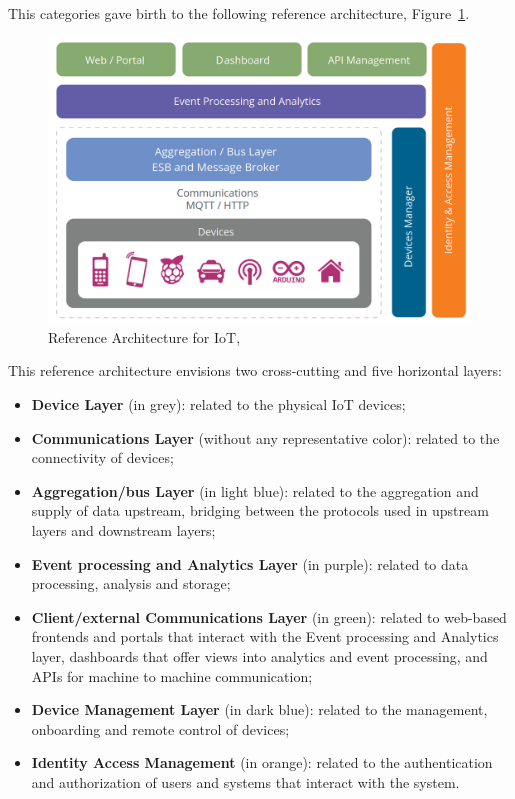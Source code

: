 This categories gave birth to the following reference architecture, Figure~\ref{fig:stateofart:arch:wso2:ra}.

\begin{figure}[H]
    \centering
    \includegraphics[scale=0.4]{
        assets/figures/wso2-ira.png
    }
    \caption[WSO2 Reference Architecture for IoT]{Reference Architecture for IoT, \cite{wso2ira}}
    \label{fig:stateofart:arch:wso2:ra}
\end{figure}

This reference architecture envisions two cross-cutting and five horizontal layers:

\begin{itemize}
    \item \textbf{Device Layer} (in grey): related to the physical \gls{IoT} devices;
    \item \textbf{Communications Layer} (without any representative color): related to the connectivity of devices;
    \item \textbf{Aggregation/bus Layer} (in light blue): related to the aggregation and supply of data upstream, bridging between the protocols used in upstream layers and downstream layers; 
    \item \textbf{Event processing and Analytics Layer} (in purple): related to data processing, analysis and storage;
    \item \textbf{Client/external Communications Layer} (in green): related to web-based frontends and portals that interact with the Event processing and Analytics layer, dashboards that
    offer views into analytics and event processing, and \gls{API}s for machine to machine communication;
    \item \textbf{Device Management Layer} (in dark blue): related to the management, onboarding and remote control of devices;
    \item \textbf{Identity Access Management} (in orange): related to the authentication and authorization of users and systems that interact with the system.
\end{itemize}

